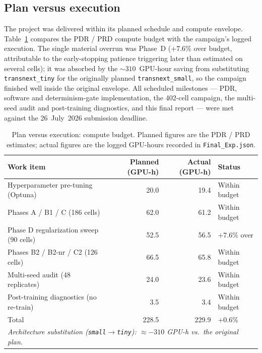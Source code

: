 \subsection{Plan versus execution}
The project was delivered within its planned schedule and compute envelope.
Table~\ref{tab:plan_exec} compares the PDR / PRD compute budget with the
campaign's logged execution. The single material overrun was Phase~D
($+7.6\%$ over budget, attributable to the early-stopping patience triggering
later than estimated on several cells); it was absorbed by the
$\sim\!310$~GPU-hour saving from substituting \texttt{transnext\_tiny} for the
originally planned \texttt{transnext\_small}, so the campaign finished well
inside the original envelope. All scheduled milestones --- PDR, software and
determinism-gate implementation, the 402-cell campaign, the multi-seed audit and
post-training diagnostics, and this final report --- were met against the
26~July~2026 submission deadline.

\begin{table}[htbp]
\centering
\caption{Plan versus execution: compute budget. Planned figures are the PDR / PRD estimates; actual figures are the logged GPU-hours recorded in \texttt{Final\_Exp.json}.}
\label{tab:plan_exec}
\setlength{\tabcolsep}{5pt}
\renewcommand{\arraystretch}{1.15}
\begin{tabular}{lrrl}
\toprule
Work item & Planned (GPU-h) & Actual (GPU-h) & Status \\
\midrule
Hyperparameter pre-tuning (Optuna)        & 20.0  & 19.4  & Within budget \\
Phases A / B1 / C (186 cells)             & 62.0  & 61.2  & Within budget \\
Phase D regularization sweep (90 cells)   & 52.5  & 56.5  & $+7.6\%$ over \\
Phases B2 / B2-nr / C2 (126 cells)        & 66.5  & 65.8  & Within budget \\
Multi-seed audit (48 replicates)          & 24.0  & 23.6  & Within budget \\
Post-training diagnostics (no re-train)   & 3.5   & 3.4   & Within budget \\
\midrule
Total                                     & 228.5 & 229.9 & $+0.6\%$ \\
\midrule
\multicolumn{4}{l}{\emph{Architecture substitution (\texttt{small}$\rightarrow$\texttt{tiny}): $\approx -310$ GPU-h vs.\ the original plan.}} \\
\bottomrule
\end{tabular}
\end{table}


